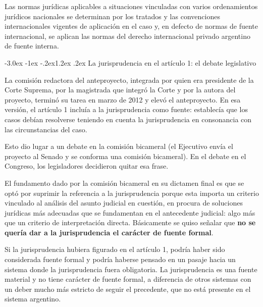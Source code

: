 \documentclass[12pt,oneside]{book}
\makeatletter
\renewcommand\section{\@startsection{section}{1}{\z@}%
  {-3.0ex \@plus -1ex \@minus -.2ex}{1.2ex \@plus .2ex}%
  {\normalfont\large\bfseries\color{acento}}}
\makeatother
\begin{document}
\begin{regla}
Las normas jurídicas aplicables a situaciones vinculadas con varios ordenamientos jurídicos nacionales se determinan por los tratados y las convenciones internacionales vigentes de aplicación en el caso y, en defecto de normas de fuente internacional, se aplican las normas del derecho internacional privado argentino de fuente interna.
\end{regla}

\section{La jurisprudencia en el artículo 1: el debate legislativo}

La comisión redactora del anteproyecto, integrada por quien era presidente de la Corte Suprema, por la magistrada que integró la Corte y por la autora del proyecto, terminó su tarea en marzo de 2012 y elevó el anteproyecto. En esa versión, el artículo 1 incluía a la jurisprudencia como fuente: establecía que los casos debían resolverse teniendo en cuenta la jurisprudencia en consonancia con las circunstancias del caso.

Esto dio lugar a un debate en la comisión bicameral (el Ejecutivo envía el proyecto al Senado y se conforma una comisión bicameral). En el debate en el Congreso, los legisladores decidieron quitar esa frase.

El fundamento dado por la comisión bicameral en su dictamen final es que se optó por suprimir la referencia a la jurisprudencia porque esta importa un criterio vinculado al análisis del asunto judicial en cuestión, en procura de soluciones jurídicas más adecuadas que se fundamentan en el antecedente judicial: algo más que un criterio de interpretación directa. Básicamente se quiso señalar que \textbf{no se quería dar a la jurisprudencia el carácter de fuente formal}.

\begin{importante}
Si la jurisprudencia hubiera figurado en el artículo 1, podría haber sido considerada fuente formal y podría haberse pensado en un pasaje hacia un sistema donde la jurisprudencia fuera obligatoria. La jurisprudencia es una fuente material y no tiene carácter de fuente formal, a diferencia de otros sistemas con un deber mucho más estricto de seguir el precedente, que no está presente en el sistema argentino.
\end{importante}
\end{document}
